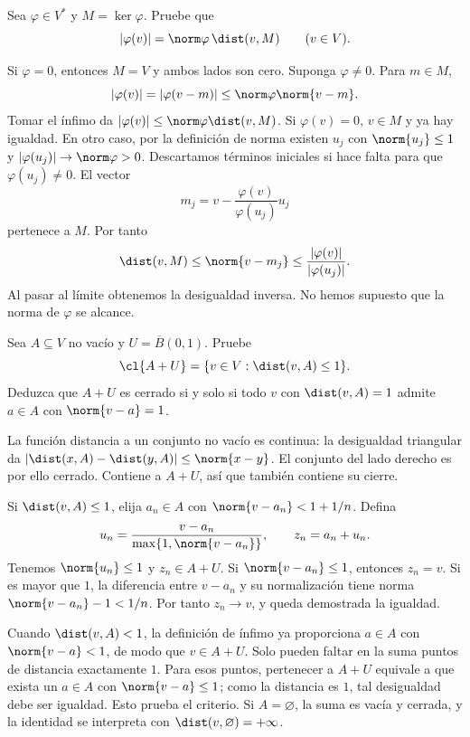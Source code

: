 \begin{ejercicio}\label{ej:lectura-21-2}
Sea $\varphi\in V^*$ y $M=\ker\varphi$. Pruebe que
\[|\varphi(v)|=\norm\varphi\,\dist(v,M)\qquad(v\in V).\]
\end{ejercicio}
\begin{solucion}
Si $\varphi=0$, entonces $M=V$ y ambos lados son cero. Suponga $\varphi\ne0$. Para $m\in M$,
\[
 |\varphi(v)|=|\varphi(v-m)|\leq\norm\varphi\norm{v-m}.
\]
Tomar el ínfimo da $|\varphi(v)|\leq\norm\varphi\dist(v,M)$. Si $\varphi(v)=0$, $v\in M$ y ya hay igualdad. En otro caso, por la definición de norma existen $u_j$ con $\norm{u_j}\leq1$ y $|\varphi(u_j)|\to\norm\varphi>0$. Descartamos términos iniciales si hace falta para que $\varphi(u_j)\ne0$. El vector
\[
 m_j=v-\frac{\varphi(v)}{\varphi(u_j)}u_j
\]
pertenece a $M$. Por tanto
\[
 \dist(v,M)\leq\norm{v-m_j}
 \leq\frac{|\varphi(v)|}{|\varphi(u_j)|}.
\]
Al pasar al límite obtenemos la desigualdad inversa. No hemos supuesto que la norma de $\varphi$ se alcance.
\end{solucion}

\begin{ejercicio}\label{ej:lectura-21-3}
Sea $A\subseteq V$ no vacío y $U=\overline B(0,1)$. Pruebe
\[
 \cl{A+U}=\{v\in V:\dist(v,A)\leq1\}.
\]
Deduzca que $A+U$ es cerrado si y solo si todo $v$ con $\dist(v,A)=1$ admite $a\in A$ con $\norm{v-a}=1$.
\end{ejercicio}
\begin{solucion}
La función distancia a un conjunto no vacío es continua: la desigualdad triangular da $|\dist(x,A)-\dist(y,A)|\leq\norm{x-y}$. El conjunto del lado derecho es por ello cerrado. Contiene a $A+U$, así que también contiene su cierre.

Si $\dist(v,A)\leq1$, elija $a_n\in A$ con $\norm{v-a_n}<1+1/n$. Defina
\[
 u_n=\frac{v-a_n}{\max\{1,\norm{v-a_n}\}},\qquad z_n=a_n+u_n.
\]
Tenemos $\norm{u_n}\leq1$ y $z_n\in A+U$. Si $\norm{v-a_n}\leq1$, entonces $z_n=v$. Si es mayor que $1$, la diferencia entre $v-a_n$ y su normalización tiene norma $\norm{v-a_n}-1<1/n$. Por tanto $z_n\to v$, y queda demostrada la igualdad.

Cuando $\dist(v,A)<1$, la definición de ínfimo ya proporciona $a\in A$ con $\norm{v-a}<1$, de modo que $v\in A+U$. Solo pueden faltar en la suma puntos de distancia exactamente $1$. Para esos puntos, pertenecer a $A+U$ equivale a que exista un $a\in A$ con $\norm{v-a}\leq1$; como la distancia es $1$, tal desigualdad debe ser igualdad. Esto prueba el criterio. Si $A=\varnothing$, la suma es vacía y cerrada, y la identidad se interpreta con $\dist(v,\varnothing)=+\infty$.
\end{solucion}

